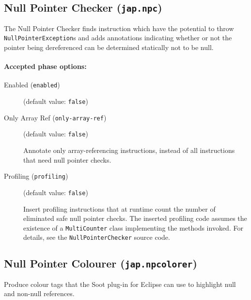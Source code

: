 \documentclass{article}
\begin{document}
\subsection{Null Pointer Checker ({\tt jap.npc})}

The Null Pointer Checker finds instruction which have the potential
to throw {\tt NullPointerException}s and adds annotations
indicating whether or not the pointer being dereferenced can be
determined statically not to be null.


\paragraph{Accepted phase options:} 

\begin{description}

\item[Enabled ({\tt enabled})]
(default value: {\tt false})






\item[Only Array Ref ({\tt only-array-ref})]
(default value: {\tt false})




Annotate only array-referencing instructions, instead of all
instructions that need null pointer checks.



\item[Profiling ({\tt profiling})]
(default value: {\tt false})





\par

Insert profiling instructions that at runtime count the number of
eliminated safe null pointer checks. The inserted profiling code
assumes the existence of a {\tt MultiCounter} class
implementing the methods invoked. For details, see the
{\tt NullPointerChecker} source code.



\end{description}

\subsection{Null Pointer Colourer ({\tt jap.npcolorer})}

Produce colour tags that the Soot plug-in for Eclipse can use to
highlight null and non-null references.
\end{document}
